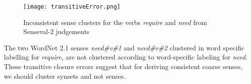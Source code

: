 \begin{figure}[h]
\begin{center}
\texttt{[image: transitiveError.png]}
\caption{Inconsistent sense clusters for the verbs \textit{require} and \textit{need} from Senseval-2 judgements}
\label{fig:transitiveError}
\end{center}
\end{figure}

The two WordNet 2.1 senses \textit{need\#v\#1} and \textit{need\#v\#2} clustered in word specific labelling for \textit{require}, are not clustered according to word-specific labeling for \textit{need}. These transitive closure errors suggest that for deriving consistent coarse senses, we should cluster synsets and not senses.

\begin{comment}
\subsection{Understanding sense clustering}
When we merge two synsets, should we modify the underlying structure of taxonomy as well?
What should be the repercussion of the mergings on the taxonomy?

An important point to note here is that if we merge two synsets and introduce the merged synsets instead of the original synsets in the WordNet taxonomy, either we'll be adding some spurious relations and/or we'll be losing some relationship information.


\subsection{Task Description}
Formally, the task we are attempting has two objectives : 
\begin{enumerate}
\item Given a fine sense inventory and taxonomy like WordNet, we wish to compute a clustering over WordNet synsets at arbitrary granularity, which can serve as a coarse sense inventory. 
\item Assessing the quality of the clustering 
\end{enumerate}

\section{Organization of Thesis}
The rest of this thesis is organized as follows. 
Chapter \ref{chapter:Background}, reviews the algorithms proposed for the task of sense clustering and the evaluation frameworks for the same. 
Chapter \ref{chapter:SupervisedSynsetSimilarity} discusses a supervised attempt to capture WordNet synset similarity using various features derived from WordNet and external corpora. 
Chapter \ref{chapter:Semi-SupervisedSynsetSimilarity}, presents a semi-supervised approach to estimate WordNet synset similarity and describes our approach to produce coarse sense inventory. 
The conclusion is provided in Chapter ????.
\end{comment}